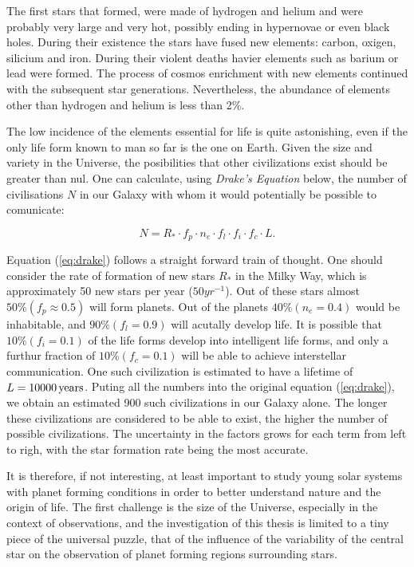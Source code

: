 The first stars that formed, were made of hydrogen and helium and were probably very large and very hot, possibly ending in hypernovae or even black holes. During their existence the stars have fused new elements: carbon, oxigen, silicium and iron. During their violent deaths havier elements such as barium or lead were formed. The process of cosmos enrichment with new elements continued with the subsequent star generations. Nevertheless, the abundance of elements other than hydrogen and helium is less than 2\%.

The low incidence of the elements essential for life is quite astonishing, even if the only life form known to man so far is the one on Earth. Given the size and variety in the Universe, the posibilities that other civilizations exist should be greater than nul. One can calculate, using \textit{Drake's Equation} below, the number of civilisations $N$ in our Galaxy with whom it would potentially be possible to comunicate:

\begin{equation}\label{eq:drake}
	N = R_{*} \cdot f_p \cdot n_e \cdot f_{l} \cdot f_{i} \cdot f_{c} \cdot L.
\end{equation}

Equation (\ref{eq:drake}) follows a straight forward train of thought. One should consider the rate of formation of new stars $R_{*}$ in the Milky Way, which is approximately 50 new stars per year ($50 yr^{-1}$). Out of these stars almost $50\%(f_{p} \approx 0.5)$ will form planets. Out of the planets $40\% (n_{e}=0.4)$ would be inhabitable, and $90\% (f_{l} = 0.9)$ will acutally develop life. It is possible that $10\%(f_{i} = 0.1)$ of the life forms develop into intelligent life forms, and only a furthur fraction of $10\%(f_{c}=0.1)$ will be able to achieve interstellar communication. One such civilization is estimated to have a lifetime of $L = 10 000 \, \rm{years}$. Puting all the numbers into the original equation (\ref{eq:drake}), we obtain an estimated 900 such civilizations in our Galaxy alone. The longer these civilizations are considered to be able to exist, the higher the number of possible civilizations. The uncertainty in the factors grows for each term from left to righ, with the star formation rate being the most accurate. 

It is therefore, if not interesting, at least important to study young solar systems with planet forming conditions in order to better understand nature and the origin of life. The first challenge is the size of the Universe, especially in the context of observations, and the investigation of this thesis is limited to a tiny piece of the universal puzzle, that of the influence of the variability of the central star on the observation of planet forming regions surrounding stars.

